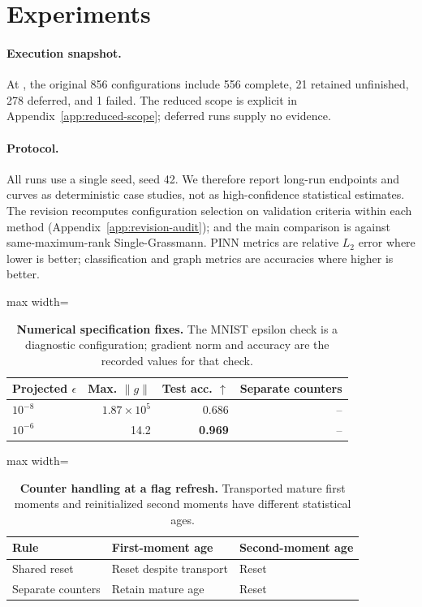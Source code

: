 \section{Experiments}

\paragraph{Execution snapshot.} At \experimentSnapshot, the original 856 configurations include 556 complete, 21 retained unfinished, 278 deferred, and 1 failed. The reduced scope is explicit in Appendix~\ref{app:reduced-scope}; deferred runs supply no evidence.
\paragraph{Protocol.} All runs use a single seed, seed 42. We therefore report long-run endpoints and curves as deterministic case studies, not as high-confidence statistical estimates. The revision recomputes configuration selection on validation criteria within each method (Appendix~\ref{app:revision-audit}); and the main comparison is against same-maximum-rank Single-Grassmann. PINN metrics are relative $L_2$ error where lower is better; classification and graph metrics are accuracies where higher is better.





\begin{table}[htbp]
\centering
\caption{\textbf{Numerical specification fixes.} The MNIST epsilon check is a diagnostic configuration; gradient norm and accuracy are the recorded values for that check.}
\label{tab:bugs}
\begin{adjustbox}{max width=\linewidth}
\begin{tabular}{lrrr}
\toprule
Projected $\epsilon$ & Max. $\|g\|$ & Test acc. $\uparrow$ & Separate counters \\
\midrule
$10^{-8}$ & $1.87\times10^5$ & 0.686 & -- \\
$10^{-6}$ & 14.2 & \textbf{0.969} & -- \\
\bottomrule
\end{tabular}
\end{adjustbox}
\end{table}
\begin{table}[htbp]
\centering
\caption{\textbf{Counter handling at a flag refresh.} Transported mature first moments and reinitialized second moments have different statistical ages.}
\label{tab:counter-fix}
\begin{adjustbox}{max width=\linewidth}
\begin{tabular}{lll}
\toprule
Rule & First-moment age & Second-moment age \\
\midrule
Shared reset & Reset despite transport & Reset \\
Separate counters & Retain mature age & Reset \\
\bottomrule
\end{tabular}
\end{adjustbox}
\end{table}


